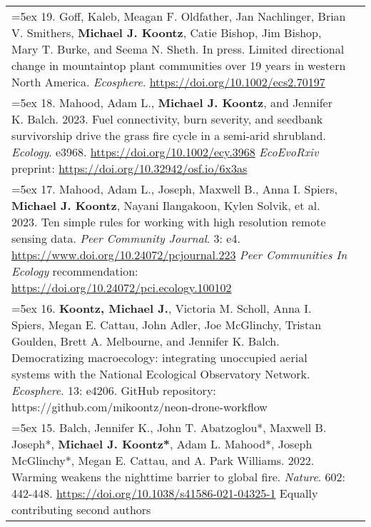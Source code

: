 \begin{longtable}{@{} >{\raggedright}p{6.10in} >{\raggedleft}X @{}}

\hangindent=5ex 19. Goff, Kaleb, Meagan F. Oldfather, Jan Nachlinger, Brian V. Smithers, \textbf{Michael J. Koontz}, Catie Bishop, Jim Bishop, Mary T. Burke, and Seema N. Sheth. In press. Limited directional change in mountaintop plant communities over 19 years in western North America. \emph{Ecosphere}. \href{https://doi.org/10.1002/ecs2.70197}{https://doi.org/10.1002/ecs2.70197} & \tabularnewline

\hangindent=5ex 18. Mahood, Adam L., \textbf{Michael J. Koontz}, and Jennifer K. Balch. 2023. Fuel connectivity, burn severity, and seedbank survivorship drive the grass fire cycle in a semi-arid shrubland. \emph{Ecology}. e3968. \href{https://doi.org/10.1002/ecy.3968}{https://doi.org/10.1002/ecy.3968}
\newline \emph{EcoEvoRxiv} preprint: \href{https://doi.org/10.32942/osf.io/6x3as}{https://doi.org/10.32942/osf.io/6x3as} & \tabularnewline

\hangindent=5ex 17. Mahood, Adam L., Joseph, Maxwell B., Anna I. Spiers, \textbf{Michael J. Koontz}, Nayani Ilangakoon, Kylen Solvik, et al. 2023. Ten simple rules for working with high resolution remote sensing data. \emph{Peer Community Journal}. 3: e4. \href{https://www.doi.org/10.24072/pcjournal.223}{https://www.doi.org/10.24072/pcjournal.223}
\newline \emph{Peer Communities In Ecology} recommendation: \href{https://doi.org/10.24072/pci.ecology.100102}{https://doi.org/10.24072/pci.ecology.100102} & \tabularnewline

\hangindent=5ex 16. \textbf{Koontz, Michael J.}, Victoria M. Scholl, Anna I. Spiers, Megan E. Cattau, John Adler, Joe McGlinchy, Tristan Goulden, Brett A. Melbourne, and Jennifer K. Balch. Democratizing macroecology: integrating unoccupied aerial systems with the National Ecological Observatory Network. \emph{Ecosphere}. 13: e4206.
\newline GitHub repository: https://github.com/mikoontz/neon-drone-workflow & \tabularnewline

\hangindent=5ex 15. Balch, Jennifer K., John T. Abatzoglou*, Maxwell B. Joseph*, \textbf{Michael J. Koontz*}, Adam L. Mahood*, Joseph McGlinchy*, Megan E. Cattau, and A. Park Williams. 2022. Warming weakens the nighttime barrier to global fire. \emph{Nature}. 602: 442-448. \href{https://doi.org/10.1038/s41586-021-04325-1}{https://doi.org/10.1038/s41586-021-04325-1}
\newline *Equally contributing second authors & \tabularnewline


\end{longtable}

